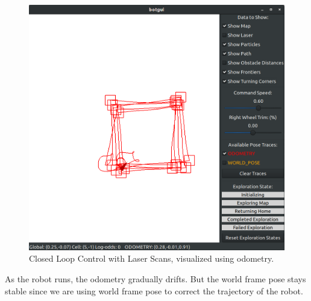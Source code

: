 \documentclass[conference]{IEEEtran}
\begin{document}
\begin{figure}[H]
\centering
\includegraphics[width=\linewidth]{lidar_wf_with_turning_corner.png}
\caption{Closed Loop Control with Laser Scans, visualized using odometry.}
\label{fig:task6}
\end{figure}

As the robot runs, the odometry gradually drifts. But the world frame pose stays stable since we are using world frame pose to correct the trajectory of the robot.


\newpage


\clearpage
\begin{appendices}
\onecolumn
\end{appendices}
\end{document}
